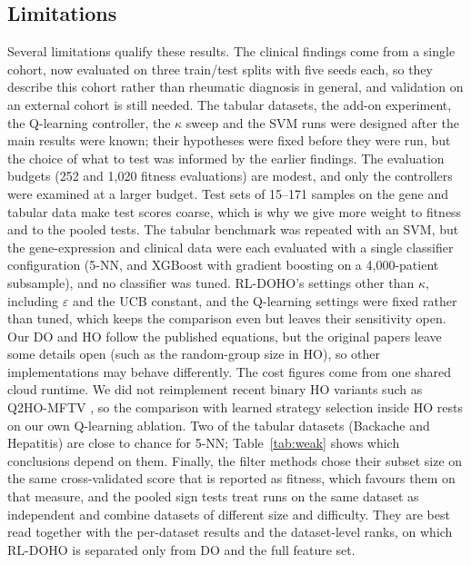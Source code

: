 \documentclass[pdflatex,sn-basic]{sn-jnl}
\begin{document}
\subsection{Limitations}
Several limitations qualify these results. The clinical findings come from a single cohort, now evaluated on three train/test splits with five seeds each, so they describe this cohort rather than rheumatic diagnosis in general, and validation on an external cohort is still needed. The tabular datasets, the add-on experiment, the Q-learning controller, the $\kappa$ sweep and the SVM runs were designed after the main results were known; their hypotheses were fixed before they were run, but the choice of what to test was informed by the earlier findings. The evaluation budgets (252 and 1,020 fitness evaluations) are modest, and only the controllers were examined at a larger budget. Test sets of 15--171 samples on the gene and tabular data make test scores coarse, which is why we give more weight to fitness and to the pooled tests. The tabular benchmark was repeated with an SVM, but the gene-expression and clinical data were each evaluated with a single classifier configuration (5-NN, and XGBoost with gradient boosting on a 4,000-patient subsample), and no classifier was tuned. RL-DOHO's settings other than $\kappa$, including $\varepsilon$ and the UCB constant, and the Q-learning settings were fixed rather than tuned, which keeps the comparison even but leaves their sensitivity open. Our DO and HO follow the published equations, but the original papers leave some details open (such as the random-group size in HO), so other implementations may behave differently. The cost figures come from one shared cloud runtime. We did not reimplement recent binary HO variants such as Q2HO-MFTV \citep{hashjin2025q2ho}, so the comparison with learned strategy selection inside HO rests on our own Q-learning ablation. Two of the tabular datasets (Backache and Hepatitis) are close to chance for 5-NN; Table~\ref{tab:weak} shows which conclusions depend on them. Finally, the filter methods chose their subset size on the same cross-validated score that is reported as fitness, which favours them on that measure, and the pooled sign tests treat runs on the same dataset as independent and combine datasets of different size and difficulty. They are best read together with the per-dataset results and the dataset-level ranks, on which RL-DOHO is separated only from DO and the full feature set.
\end{document}
